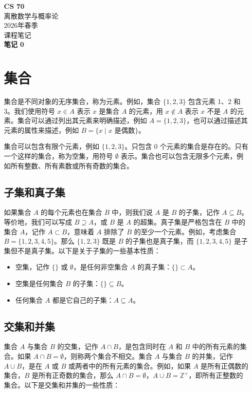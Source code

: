 \documentclass[11pt]{article}
\begin{document}
\begin{center}
{\Large\bfseries CS 70}\\[0.2em]
离散数学与概率论\\[0.1em]
2026年春季\\[0.1em]
课程笔记\\[0.3em]
\textbf{笔记 0}
\end{center}

\section{集合}

集合是不同对象的无序集合，称为元素。例如，集合 $\{1, 2, 3\}$ 包含元素 1、2 和 3。我们使用符号 $x \in A$ 表示 $x$ 是集合 $A$ 的元素，用 $x \notin A$ 表示 $x$ 不是 $A$ 的元素。集合可以通过列出其元素来明确描述，例如 $A = \{1, 2, 3\}$，也可以通过描述其元素的属性来描述，例如 $B = \{x \mid x \text{ 是偶数}\}$。

集合可以包含有限个元素，例如 $\{1, 2, 3\}$。只包含 0 个元素的集合是存在的。只有一个这样的集合，称为空集，用符号 $\emptyset$ 表示。集合也可以包含无限多个元素，例如所有整数、所有素数或所有奇数的集合。

\subsection*{子集和真子集}

如果集合 $A$ 的每个元素也在集合 $B$ 中，则我们说 $A$ 是 $B$ 的子集，记作 $A \subseteq B$。等价地，我们可以写成 $B \supseteq A$，或 $B$ 是 $A$ 的超集。真子集是严格包含在 $B$ 中的集合 $A$，记作 $A \subset B$，意味着 $A$ 排除了 $B$ 的至少一个元素。例如，考虑集合 $B = \{1, 2, 3, 4, 5\}$。那么 $\{1, 2, 3\}$ 既是 $B$ 的子集也是真子集，而 $\{1, 2, 3, 4, 5\}$ 是子集但不是真子集。以下是关于子集的一些基本性质：

\begin{itemize}
\item 空集，记作 $\{\}$ 或 $\emptyset$，是任何非空集合 $A$ 的真子集：$\{\} \subset A$。
\item 空集是任何集合 $B$ 的子集：$\{\} \subseteq B$。
\item 任何集合 $A$ 都是它自己的子集：$A \subseteq A$。
\end{itemize}

\subsection*{交集和并集}

集合 $A$ 与集合 $B$ 的交集，记作 $A \cap B$，是包含同时在 $A$ 和 $B$ 中的所有元素的集合。如果 $A \cap B = \emptyset$，则称两个集合不相交。集合 $A$ 与集合 $B$ 的并集，记作 $A \cup B$，是在 $A$ 或 $B$ 或两者中的所有元素的集合。例如，如果 $A$ 是所有正偶数的集合，$B$ 是所有正奇数的集合，那么 $A \cap B = \emptyset$，$A \cup B = \mathbb{Z}^+$，即所有正整数的集合。以下是交集和并集的一些性质：
\end{document}
